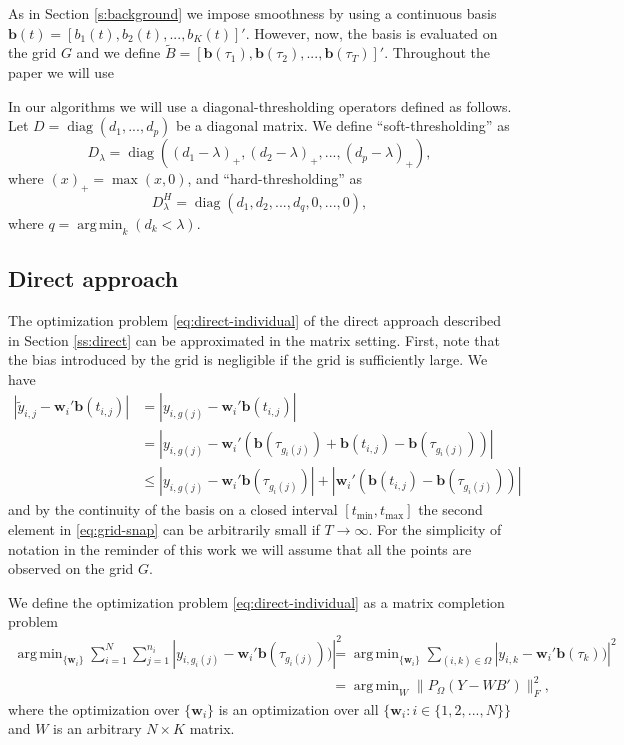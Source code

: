 \documentclass[preprint]{imsart}
\numberwithin{equation}{section}
\theoremstyle{plain}
\newcommand{\bb}{\mathbf{b}}
\newcommand{\bw}{\mathbf{w}}
\DeclareMathOperator*{\argmin}{arg\,min}
\DeclareMathOperator*{\diag}{diag}
\begin{document}
As in Section \ref{s:background} we impose smoothness by using a continuous basis $\bb(t) = [b_1(t),b_2(t),...,b_K(t)]'$. However, now, the basis is evaluated on the grid $G$ and we define $\tilde{B} = [\bb(\tau_1),\bb(\tau_2),...,\bb(\tau_T)]'$. Throughout the paper we will use 

In our algorithms we will use a diagonal-thresholding operators defined as follows. Let $D = \diag(d_1,...,d_p)$ be a diagonal matrix. We define ``soft-thresholding'' as
\begin{equation*}
D_\lambda = \diag((d_1 - \lambda)_+,(d_2 - \lambda)_+,...,(d_p - \lambda)_+),\label{eq:thresholding}
\end{equation*}
where $(x)_+ = \max(x, 0)$, and ``hard-thresholding'' as
\begin{equation*}
D_\lambda^H = \diag(d_1,d_2,...,d_q,0,...,0),\label{eq:thresholding}
\end{equation*}
where $q = \argmin_k(d_k < \lambda)$.

\subsection{Direct approach}\label{ss:direct-matrix}

The optimization problem \eqref{eq:direct-individual} of the direct approach described in Section \ref{ss:direct} can be approximated in the matrix setting. First, note that the bias introduced by the grid is negligible if the grid is sufficiently large. We have
\begin{align}
  \left|\tilde y_{i,j} - \bw_i'\bb(t_{i,j})\right| &= \left|y_{i,g(j)} - \bw_i'\bb(t_{i,j})\right|\nonumber\\
  &= \left| y_{i,g(j)} - \bw_i' (\bb (\tau_{g_i(j)}) + \bb (t_{i,j}) - \bb (\tau_{g_i(j)}))\right|\nonumber\\
  &\leq \left| y_{i,g(j)} - \bw_i' \bb(\tau_{g_i(j)})\right| + \left|\bw_i' (\bb(t_{i,j}) - \bb(\tau_{g_i(j)}))\right|\label{eq:grid-snap}
\end{align}
and by the continuity of the basis on a closed interval $[t_{\min},t_{\max}]$ the second element in \eqref{eq:grid-snap} can be arbitrarily small if $T \rightarrow \infty$. For the simplicity of notation in the reminder of this work we will assume that all the points are observed on the grid $G$.  %

We define the optimization problem \eqref{eq:direct-individual} as a matrix completion problem
\begin{align}
 \argmin_{\{\bw_i\}}\sum_{i=1}^N \sum_{j=1}^{n_i}\left|y_{i,g_i(j)} - \bw_i' \bb(\tau_{g_i(j)}))\right|^2 &= \argmin_{\{\bw_i\}}\sum_{(i,k) \in \Omega}\left|y_{i,k} - \bw_i' \bb(\tau_{k}))\right|^2\nonumber\\
&= \argmin_W \| P_\Omega(Y - WB') \|_F^2,\label{eq:direct-matrix}
\end{align}
where the optimization over $\{\bw_i\}$ is an optimization over all $\{\bw_i : i \in \{ 1,2,...,N \}\}$ and $W$ is an arbitrary $N \times K$ matrix.
\end{document}
